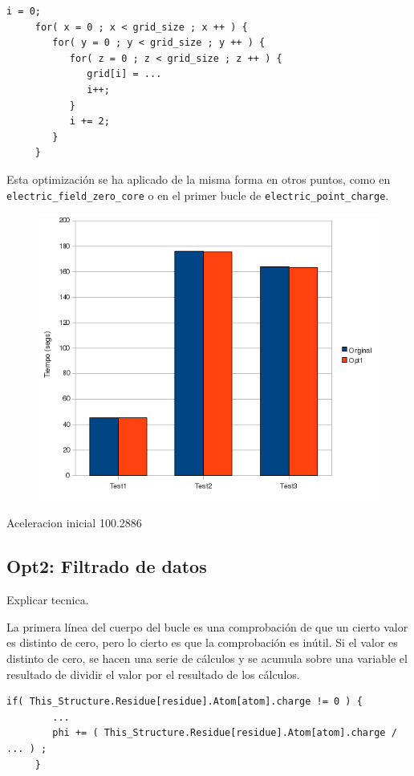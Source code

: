 \begin{lstlisting}[]
     i = 0;
     for( x = 0 ; x < grid_size ; x ++ ) {
        for( y = 0 ; y < grid_size ; y ++ ) {
           for( z = 0 ; z < grid_size ; z ++ ) {
              grid[i] = ...
              i++;
           }
           i += 2;
        }
     }
\end{lstlisting}

Esta optimizaci\'{o}n se ha aplicado de la misma forma en otros puntos, como en
\texttt{electric\_field\_zero\_core} o en el primer bucle de
\texttt{electric\_point\_charge}.

\begin{figure}[ht]
   \centering
   \includegraphics[keepaspectratio=true,width=.6\textwidth]{figures/opt1-perf}
\end{figure}

Aceleracion inicial	100.2886%

\subsection{Opt2: Filtrado de datos}

Explicar tecnica.

La primera l\'{i}nea del cuerpo del bucle es una comprobaci\'{o}n de que un
cierto valor es distinto de cero, pero lo cierto es que la comprobaci\'{o}n es
in\'{u}til. Si el valor es distinto de cero, se hacen una serie de c\'{a}lculos
y se acumula sobre una variable el resultado de dividir el valor por el
resultado de los c\'{a}lculos.

\begin{lstlisting}[]
     if( This_Structure.Residue[residue].Atom[atom].charge != 0 ) {
        ...
        phi += ( This_Structure.Residue[residue].Atom[atom].charge / ... ) ;
     }
\end{lstlisting}

